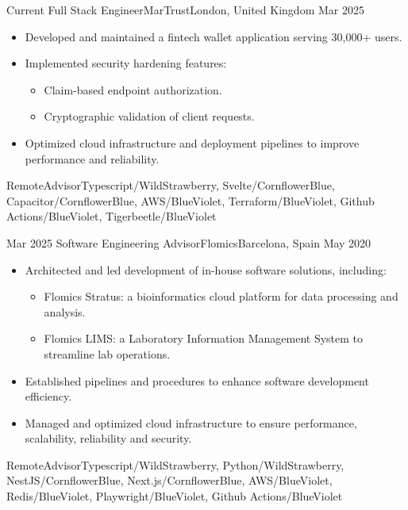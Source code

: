 %
%
%
\begin{experiences}
  \experience
  {Current} {Full Stack Engineer}{MarTrust}{London, United Kingdom}
  {Mar 2025}{\begin{itemize}
    \item Developed and maintained a fintech wallet application serving 30,000+ users.
    \item Implemented security hardening features:
    \begin{itemize}
      \item Claim-based endpoint authorization.
      \item Cryptographic validation of client requests.
    \end{itemize}
    \item Optimized cloud infrastructure and deployment pipelines to improve performance and reliability.
    \end{itemize}}
    {Remote}{Advisor}{Typescript/WildStrawberry, Svelte/CornflowerBlue, Capacitor/CornflowerBlue, AWS/BlueViolet, Terraform/BlueViolet, Github Actions/BlueViolet, Tigerbeetle/BlueViolet}
  
  \emptySeparator

  \experience
  {Mar 2025} {Software Engineering Advisor}{Flomics}{Barcelona, Spain}
  {May 2020}{\begin{itemize}
    \item Architected and led development of in-house software solutions, including:
    \begin{itemize}
    \item Flomics Stratus: a bioinformatics cloud platform for data processing and analysis.
    \item Flomics LIMS: a Laboratory Information Management System to streamline lab operations.
    \end{itemize}
    \item Established pipelines and procedures to enhance software development efficiency.
    \item Managed and optimized cloud infrastructure to ensure performance, scalability, reliability and security.
    \end{itemize}}
  {Remote}{Advisor}{Typescript/WildStrawberry, Python/WildStrawberry, NestJS/CornflowerBlue, Next.js/CornflowerBlue, AWS/BlueViolet, Redis/BlueViolet, Playwright/BlueViolet, Github Actions/BlueViolet}
  

\end{experiences}
